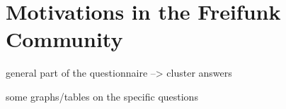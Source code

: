 \section{Motivations in the Freifunk Community}

general part of the questionnaire
--> cluster answers

some graphs/tables on the specific questions

\begin{comment}
* is the focus of the paper;

* only pull up the foss motivations as comparison to underline similarities and differences with the foundings here

* find a suitable neat form for presenting the foundings
\end{comment}

\begin{comment}
  ## Spannend (Manche zusammengefasste Beobachtungen):

* Nicht alle verstehen das selbe unter Netzneutralität und nicht alle erachten das als wichtig (je nach Verständnis)
* (initielle) Mitmachmotivationen verschiedener Generationen werden sichtbar:
  ** Menschen, die vor 2008 angefangen haben: Probleme mit (schnellem) Internetzugang bekommen, man nimmt das in die eigenen Hände
  ** Menschen, die später angefangen haben: eher aus Interesse an Netzwerktechnik/ finden die polit. Idee gut
* mehrerer sprechen den Community-Aspect an: also die Möglichkeit gemeinsam ein Projekt aufzubauen, interessante Menschen kennen zu lernen, "aus dem eigenen Dunst rauskommen"
* nicht viele Menschen sprechen die Idee an, das eigene Wissen zu teilen (auch wenn es eine der Zentralthemen in der Selbstdarstellung vom Projekt ist)
* "es gibt die Ego-Leute und es gibt die Altruisten"


##  Gemeinsamkeiten/Unterschiede in den Motivationen

* niemand macht Freifunk, weil er_sie dafür bezahlt wird
* (fast) niemand nimmt am Projekt teil, weil er_sie sich davon bessere Kontakte/Jobchancen verspricht (wird eher als Nebenprodukt gesehen) (an FOSS dagegen angeblich schon)
* sowohl bei FOSS als auch bei Freifunk gibt es Menschen, die aus persönlichen Bedürfnissen teilnehmen ("Ich hatte kein Netz" / "Ich brauchte das Feature XY")
* auch wenn mir unklar ist, wie ich Altruismus messen sollte, scheinen bei Freifunk die Mehrheit der Menschen von der politischen Idee einer dezentralen autonomen Kommunikationsinfrastruktur bewegt zu werden
* Communitybildung/-zugehörigkeit wichtig
* ein Großteil der Menschen findet die Beschäftigung mit Netzwerken spannend
* einige wollen ihre Netzwerkkenntnisse und -fähigkeiten ausbauen, scheint aber nicht so in Fokus zu sein (dagegen bei FOSS eher)

---

Die Papers beschäftigen sich (vor allem) mit der Motivation von Entwickler*innen. Allerdings gibt es auch andere Möglichkeiten zu beiden Communities beizutragen (user documentation, publicity, design, Übersetzung, ...). Kann man sich da andere Motivationen vorstellen?
\end{comment}

